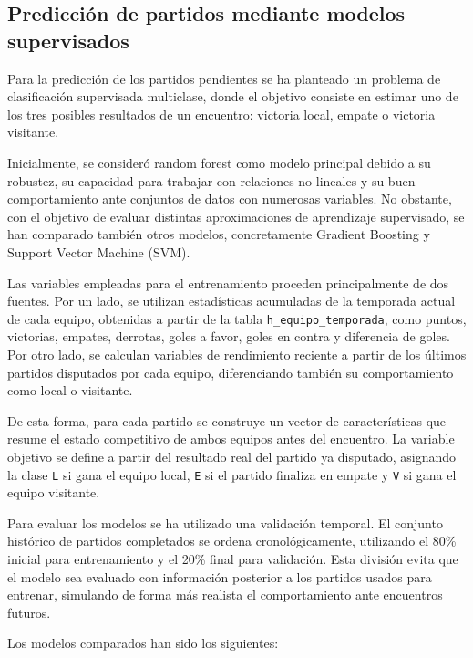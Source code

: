 \subsection{Predicción de partidos mediante modelos supervisados}

Para la predicción de los partidos pendientes se ha planteado un problema de
clasificación supervisada multiclase, donde el objetivo consiste en estimar uno de los tres posibles resultados de un encuentro: victoria local, empate o victoria visitante.

Inicialmente, se consideró random forest como modelo principal debido a su robustez, su capacidad para trabajar con relaciones no lineales y su buen comportamiento ante conjuntos de datos con numerosas variables. No obstante, con el objetivo de evaluar distintas aproximaciones de aprendizaje supervisado, se han comparado también otros modelos, concretamente Gradient Boosting y Support Vector Machine (SVM).

Las variables empleadas para el entrenamiento proceden principalmente de dos fuentes. Por un lado, se utilizan estadísticas acumuladas de la temporada actual de cada equipo, obtenidas a partir de la tabla \texttt{h\_equipo\_temporada}, como puntos, victorias, empates, derrotas, goles a favor, goles en contra y diferencia de goles. Por otro lado,
se calculan variables de rendimiento reciente a partir de los últimos partidos disputados por cada equipo, diferenciando también su comportamiento como local o visitante.

De esta forma, para cada partido se construye un vector de características que resume el estado competitivo de ambos equipos antes del encuentro. La variable objetivo se define a partir del resultado real del partido ya disputado, asignando la clase \texttt{L} si gana el equipo local, \texttt{E} si el partido finaliza en empate y \texttt{V} si gana el equipo visitante.

Para evaluar los modelos se ha utilizado una validación temporal. El conjunto histórico de partidos completados se ordena cronológicamente, utilizando el 80\% inicial para entrenamiento y el 20\% final para validación. Esta división evita que el modelo sea evaluado con información posterior a los partidos usados para entrenar, simulando de forma más realista el comportamiento ante encuentros futuros.

Los modelos comparados han sido los siguientes:

